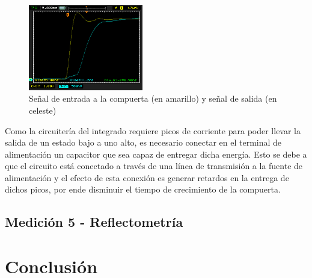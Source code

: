 \documentclass[a4paper,10pt]{article}
\begin{document}
		\begin{figure}[!htb]
			\centering
			\includegraphics[width=5cm]
			{Imagenes/Risetime3.png}
			\caption{Se\~nal de entrada a la compuerta (en amarillo) y se\~nal 
			de salida (en celeste)}
			\label{img009}
		\end{figure}
	\indent Como la circuitería del integrado requiere picos de corriente para 
	poder llevar la salida de un estado bajo a uno alto, es necesario conectar 
	en el terminal de alimentación un capacitor que sea capaz de entregar dicha 
	energía. Esto se debe a que el circuito está conectado a través de una línea
	de transmisión a la fuente de alimentación y el efecto de esta conexión es 
	generar retardos en la entrega de dichos picos, por ende disminuir el tiempo
	de crecimiento de la compuerta.
	\subsection{Medición 5 - Reflectometría}
	\newpage 
	\section{Conclusión}
\end{document}
